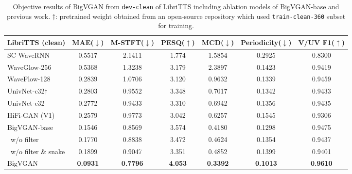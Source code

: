 \documentclass{article} \usepackage{iclr2023_conference,times}
\theoremstyle{plain}
\theoremstyle{definition}
\theoremstyle{remark}
\begin{document}
\begin{table*}[t]
\caption{\footnotesize Objective results of BigVGAN from \texttt{dev-clean} of LibriTTS including ablation models of BigVGAN-base and previous work. $\dagger$: pretrained weight obtained from an open-source repository which used \texttt{train-clean-360} subset for training.}
\label{libritts-numeric-clean}
\vspace{-0.05cm}
\begin{center}
\begin{small}
\begin{adjustbox}{width=0.9\textwidth}
\begin{tabular}{l|cccccc}
\toprule
LibriTTS (clean)  & MAE($\downarrow$) & M-STFT($\downarrow$) & PESQ($\uparrow$) & MCD($\downarrow$) & Periodicity($\downarrow$) & V/UV F1($\uparrow$) \\
\midrule
SC-WaveRNN   & 0.5517 & 2.1411 & 1.774 & 1.5854 & 0.2925 & 0.8300 \\
WaveGlow-256 & 0.5368 & 1.3238 & 3.179 & 2.3897 & 0.1423 & 0.9419 \\
WaveFlow-128 & 0.2839 & 1.0706 & 3.120 & 0.9632 & 0.1339 & 0.9459 \\
UnivNet-c32$\dagger$ & 0.2803 & 0.9552 & 3.348 & 0.7017 & 0.1342 & 0.9433 \\
UnivNet-c32 & 0.2772 & 0.9433 & 3.310 & 0.6942 & 0.1356 & 0.9435 \\
HiFi-GAN (V1) & 0.2579 & 0.9773 & 3.042 & 0.6257 & 0.1545 & 0.9306 \\
\midrule
BigVGAN-base    & 0.1546 & 0.8569 & 3.574 & 0.4180 & 0.1298 & 0.9475 \\
\ w/o filter    & 0.1770 & 0.8838 & 3.472 & 0.4624 & 0.1354 & 0.9437 \\
\ w/o filter \& snake    & 0.1899 & 0.9047 & 3.351 & 0.4852 & 0.1399 & 0.9401\\
\midrule
BigVGAN    & \textbf{0.0931} & \textbf{0.7796} & \textbf{4.053} & \textbf{0.3392} & \textbf{0.1013} & \textbf{0.9610}\\
\bottomrule
\end{tabular}
\end{adjustbox}
\end{small}
\end{center}
\vskip -0.1in
\end{table*}
\end{document}
